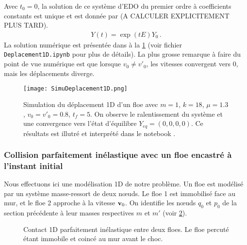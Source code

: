 \noindent Avec $t_0= 0$, la solution de ce système d'EDO du premier ordre à coefficients constants est unique et est donnée par (A CALCULER EXPLICITEMENT PLUS TARD).
\begin{align}
    Y(t) = \exp(tE)Y_0 \,.
\end{align}
La solution numérique est présentée dans à la \cref{fig:simudept1d} (voir fichier \verb|Deplacement1D.ipynb| pour plus de détails). La plus grosse remarque à faire du point de vue numérique est que lorsque $v_0 \neq v'_0$, les vitesses convergent vers $0$, mais les déplacements diverge.
\begin{figure}[!h]
    \centering
    \texttt{[image: SimuDeplacement1D.png]}
    \caption{Simulation du déplacement 1D d'un floe avec $m=1$, $k=18$, $\mu=1.3$, $v_0=v'_0 = 0.8$, $t_{f}=5$. On observe le ralentissement du système et une convergence vers l'état d'équilibre $Y_{eq}= (0,0,0,0)$. Ce résultats est illutré et interprété dans le notebook .}
    \label{fig:simudept1d}
\end{figure}









\subsubsection{Collision parfaitement inélastique avec un floe encastré à l'instant initial}

Nous effectuons ici une modélisation 1D de notre problème. Un floe est modélisé par un système masse-ressort de deux nœuds. Le floe 1 est immobilisé face au mur, et le floe 2 approche à la vitesse $\bm{\mathrm{v}}_0$. On identifie les nœuds $q_0$ et $p_0$ de la section précédente à leur masses respectives $m$ et $m'$ (voir \cref{fig:contact1d}).
\begin{figure}[!h]
    \centering
    \caption{Contact 1D parfaitement inélastique entre deux floes. Le floe percuté étant immobile et coincé au mur avant le choc.}
    \label{fig:contact1d}
\end{figure}

